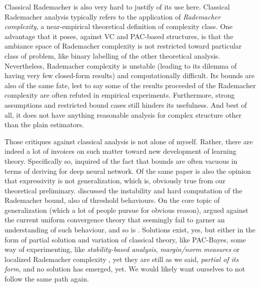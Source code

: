 Classical Rademacher is also very hard to justify of its use here. Classical Rademacher analysis typically refers to the application of \textit{Rademacher complexity}, a near-empirical theoretical definition of complexity class. One advantage that it poses, against VC and PAC-based structures, is that the ambiance space of Rademacher complexity is not restricted toward particular class of problem, like binary labelling of the other theoretical analysis. Nevertheless, Rademacher complexity is unstable (leading to its dilemma of having very few closed-form results) and computationally difficult. Its bounds are also of the same fate, lest to say some of the results proceeded of the Rademacher complexity are often refuted in empirical experiments. Furthermore, strong assumptions and restricted bound cases still hinders its usefulness. And best of all, it does not have anything reasonable analysis for complex structure other than the plain estimators. 

Those critiques against classical analysis is not alone of myself. Rather, there are indeed a lot of invoices on such matter toward new development of learning theory. Specifically so, \cite{zhang2017understandingdeeplearningrequires} inquired of the fact that bounds are often vacuous in terms of deriving for deep neural network. Of the same paper is also the opinion that expressivity is not generalization, which is, obviously true from our theoretical preliminary. \cite{truong2025rademachercomplexitybasedgeneralizationbounds} discussed the instability and hard computation of the Rademacher bound, also of threshold behaviours. On the core topic of generalization (which a lot of people pursue for obvious reason), \cite{nagarajan2021uniformconvergenceunableexplain} argued against the current uniform convergence theory that seemingly fail to garner an understanding of such behaviour, and so is \cite{tunali2019empirical}. Solutions exist, yes, but either in the form of partial solution and variation of classical theory, like PAC-Bayes, some way of experimenting, like \textit{stability-based analysis}, \textit{margin/norm measures} or localized Rademacher complexity \cite{bartlett2005local,bartlett2017spectrally,bousquet2002stability,neyshabur2015norm}, yet they are still as we said, \textit{partial of its form}, and no solution has emerged, yet. We would likely want ourselves to not follow the same path again. 

